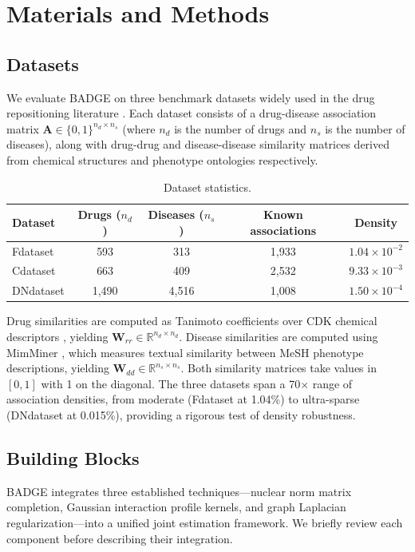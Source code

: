 \documentclass{oup-authoring-template}
\newcommand{\R}{\mathbb{R}}
\begin{document}
\section{Materials and Methods}

\subsection{Datasets}

We evaluate BADGE on three benchmark datasets widely used in the drug repositioning literature \cite{yang2019,luo2016,gao2023}. Each dataset consists of a drug-disease association matrix $\mathbf{A} \in \{0,1\}^{n_d \times n_s}$ (where $n_d$ is the number of drugs and $n_s$ is the number of diseases), along with drug-drug and disease-disease similarity matrices derived from chemical structures and phenotype ontologies respectively.

\begin{table}[htbp]
\centering
\caption{Dataset statistics.}
\label{tab:datasets}
\begin{tabular}{lcccc}
\toprule
Dataset & Drugs ($n_d$) & Diseases ($n_s$) & Known associations & Density \\
\midrule
Fdataset & 593 & 313 & 1,933 & $1.04 \times 10^{-2}$ \\
Cdataset & 663 & 409 & 2,532 & $9.33 \times 10^{-3}$ \\
DNdataset & 1,490 & 4,516 & 1,008 & $1.50 \times 10^{-4}$ \\
\bottomrule
\end{tabular}
\end{table}

Drug similarities are computed as Tanimoto coefficients over CDK chemical descriptors \cite{steinbeck2003}, yielding $\mathbf{W}_{rr} \in \R^{n_d \times n_d}$. Disease similarities are computed using MimMiner \cite{vandriel2006}, which measures textual similarity between MeSH phenotype descriptions, yielding $\mathbf{W}_{dd} \in \R^{n_s \times n_s}$. Both similarity matrices take values in $[0, 1]$ with 1 on the diagonal. The three datasets span a 70$\times$ range of association densities, from moderate (Fdataset at 1.04\%) to ultra-sparse (DNdataset at 0.015\%), providing a rigorous test of density robustness.

\subsection{Building Blocks}

BADGE integrates three established techniques---nuclear norm matrix completion, Gaussian interaction profile kernels, and graph Laplacian regularization---into a unified joint estimation framework. We briefly review each component before describing their integration.
\end{document}

